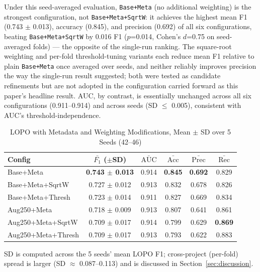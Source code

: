 \documentclass[preprint,12pt]{elsarticle}
\begin{document}
Under this seed-averaged evaluation, \texttt{Base+Meta} (no additional weighting) is the strongest configuration, not \texttt{Base+Meta+SqrtW}: it achieves the highest mean F1 (0.743 $\pm$ 0.013), accuracy (0.845), and precision (0.692) of all six configurations, beating \texttt{Base+Meta+SqrtW} by 0.016 F1 ($p$=0.014, Cohen's $d$=0.75 on seed-averaged folds) — the opposite of the single-run ranking. The square-root weighting and per-fold threshold-tuning variants each reduce mean F1 relative to plain \texttt{Base+Meta} once averaged over seeds, and neither reliably improves precision the way the single-run result suggested; both were tested as candidate refinements but are not adopted in the configuration carried forward as this paper's headline result. AUC, by contrast, is essentially unchanged across all six configurations (0.911--0.914) and across seeds (SD $\le$ 0.005), consistent with AUC's threshold-independence.

\begin{table}[t]
\centering
\setlength{\tabcolsep}{2.5pt}
\begin{tabular}{lccccc}
\toprule
\textbf{Config} & \textbf{$\bar{F_1}$ ($\pm$SD)} & \textbf{$\bar{\text{AUC}}$} & \textbf{$\bar{\text{Acc}}$} & \textbf{$\bar{\text{Prec}}$} & \textbf{$\bar{\text{Rec}}$} \\
\midrule
Base+Meta & \textbf{0.743 $\pm$ 0.013} & 0.914 & \textbf{0.845} & \textbf{0.692} & 0.829 \\
Base+Meta+SqrtW & 0.727 $\pm$ 0.012 & 0.913 & 0.832 & 0.678 & 0.826 \\
Base+Meta+Thresh & 0.723 $\pm$ 0.014 & 0.911 & 0.827 & 0.669 & 0.834 \\
Aug250+Meta & 0.718 $\pm$ 0.009 & 0.913 & 0.807 & 0.641 & 0.861 \\
Aug250+Meta+SqrtW & 0.709 $\pm$ 0.017 & 0.914 & 0.799 & 0.629 & \textbf{0.869} \\
Aug250+Meta+Thresh & 0.709 $\pm$ 0.017 & 0.913 & 0.793 & 0.622 & 0.883 \\
\bottomrule
\end{tabular}
\caption{LOPO with Metadata and Weighting Modifications, Mean $\pm$ SD over 5 Seeds (42--46)}
\label{tab:meta}
\begin{flushleft}
\footnotesize SD is computed across the 5 seeds' mean LOPO F1; cross-project (per-fold) spread is larger (SD $\approx$ 0.087--0.113) and is discussed in Section~\ref{sec:discussion}.
\end{flushleft}
\end{table}
\end{document}
